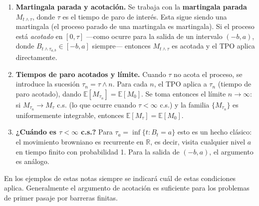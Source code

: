 \documentclass[12pt]{book}
\begin{document}
\begin{enumerate}
    \item \textbf{Martingala parada y acotación.} Se trabaja con la \textbf{martingala parada} $M_{t \wedge \tau}$, donde $\tau$ es el tiempo de paro de interés. Esta sigue siendo una martingala (el proceso parado de una martingala es martingala). Si el proceso está \emph{acotado} en $[0,\tau]$ —como ocurre para la salida de un intervalo $(-b,a)$, donde $B_{t\wedge\tau_{a,b}} \in [-b,a]$ siempre— entonces $M_{t \wedge \tau}$ es acotada y el TPO aplica directamente.

    \item \textbf{Tiempos de paro acotados y límite.} Cuando $\tau$ no acota el proceso, se introduce la sucesión $\tau_n = \tau \wedge n$. Para cada $n$, el TPO aplica a $\tau_n$ (tiempo de paro acotado), dando $\mathbb{E}[M_{\tau_n}] = \mathbb{E}[M_0]$. Se toma entonces el límite $n \to \infty$: si $M_{\tau_n} \to M_\tau$ c.s. (lo que ocurre cuando $\tau < \infty$ c.s.) y la familia $\{M_{\tau_n}\}$ es uniformemente integrable, entonces $\mathbb{E}[M_\tau] = \mathbb{E}[M_0]$.

    \item \textbf{¿Cuándo es $\tau < \infty$ c.s.?} Para $\tau_a = \inf\{t: B_t = a\}$ esto es un hecho clásico: el movimiento browniano es recurrente en $\mathbb{R}$, es decir, visita cualquier nivel $a$ en tiempo finito con probabilidad 1. Para la salida de $(-b,a)$, el argumento es análogo.
\end{enumerate}

En los ejemplos de estas notas siempre se indicará cuál de estas condiciones aplica. Generalmente el argumento de acotación es suficiente para los problemas de primer pasaje por barreras finitas.
\end{document}
